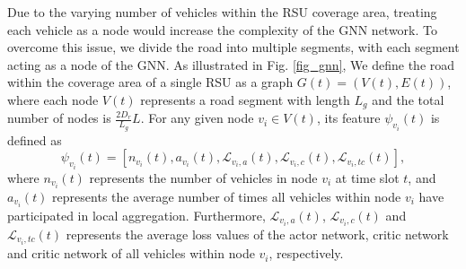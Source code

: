\documentclass[lettersize,journal,onecolumn]{IEEEtran}
\begin{document}
 

Due to the varying number of vehicles within the RSU coverage area, treating each vehicle as a node would increase the complexity of the GNN network. To overcome this issue, we divide the road into multiple segments, with each segment acting as a node of the GNN. As illustrated in Fig. \ref{fig_gnn}, We define the road within the coverage area of a single RSU as a graph $G(t)=(V(t),E(t))$, where each node $V(t)$ represents a road segment with length ${{L}_{g}}$ and the total number of nodes is $\frac{2{{D}_{r}}}{{{L}_{g}}}L$. 
For any given node ${{v}_{i}}\in V(t)$, its feature  ${{\psi }_{{{v}_{i}}}}\left( t \right)$ is defined as
\begin{equation}
{{\psi }_{{{v}_{i}}}}\left( t \right)=[{{n}_{{{v}_{i}}}}(t),{{a}_{{{v}_{i}}}}(t),{{\mathcal{L}}_{{{v}_{i}},a}}(t),{{\mathcal{L}}_{{{v}_{i}},c}}(t),{{\mathcal{L}}_{{{v}_{i}},tc}}(t)]
\label{eq15},
\end{equation}
where ${{n}_{{{v}_{i}}}}(t)$ represents the number of vehicles in node ${{v}_{i}}$ at time slot $t$, and ${{a}_{{{v}_{i}}}}(t)$ represents the average number of times all vehicles within node ${{v}_{i}}$ have participated in local aggregation. Furthermore, ${{\mathcal{L}}_{{{v}_{i}},a}}(t)$, ${{\mathcal{L}}_{{{v}_{i}},c}}(t)$ and ${{\mathcal{L}}_{{{v}_{i}},{{tc}}}}(t)$ represents the average loss values of the actor network, critic network and critic network of all vehicles within node ${{v}_{i}}$, respectively.
\end{document}
